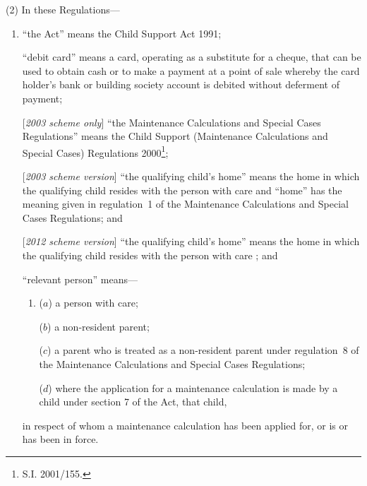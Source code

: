 \documentclass[12pt,a4paper]{article}
\begin{document}
(2) In these Regulations—
\begin{enumerate}\item[]
“the Act” means the Child Support Act 1991;

“debit card” means a card, operating as a substitute for a cheque, that can be used to obtain cash or to make a payment at a point of sale whereby the card holder’s bank or building society account is debited without deferment of payment;

[\emph{2003 scheme only}] “the Maintenance Calculations and Special Cases Regulations” means the Child Support (Maintenance Calculations and Special Cases) Regulations 2000\footnote{\frenchspacing S.I. 2001/155.};

[\emph{2003 scheme version}] “the qualifying child’s home” means the home in which the qualifying child resides with the person with care and “home” has the meaning given in regulation~1 of the Maintenance Calculations and Special Cases Regulations; and

[\emph{2012 scheme version}] “the qualifying child’s home” means the home in which the qualifying child resides with the person with care%
; and

“relevant person” means—
\begin{enumerate}\item[]
($a$) 
a person with care;

($b$) 
a non-resident parent;

($c$) 
a parent who is treated as a non-resident parent under regulation~8 of the Maintenance Calculations and Special Cases Regulations;

($d$) 
where the application for a maintenance calculation is made by a child under section 7 of the Act, that child,
\end{enumerate}
in respect of whom a maintenance calculation has been applied for, 
or is or has been in force.
\end{enumerate}

\end{document}
